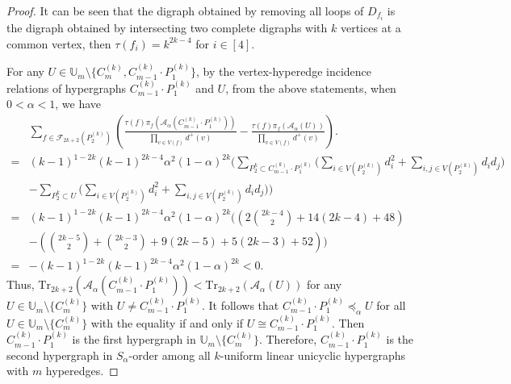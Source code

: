 \documentclass[10pt,a4paper]{amsart}
\begin{document}
\begin{proof}
It can be seen that the digraph obtained by removing all loops of $D_{f_i}$ is the digraph obtained by intersecting two complete digraphs with $k$ vertices at a common vertex, then $\tau(f_i)=k^{2k-4}$ for $i\in[4]$.

For any $U\in\mathbb{U}_{m}\setminus\{C_{m}^{(k)},C_{m-1}^{(k)}\cdot P_{1}^{(k)}\}$, by the vertex-hyperedge incidence relations of hypergraphs $C_{m-1}^{(k)}\cdot P_{1}^{(k)}$ and $U$, from the above statements,
when $0<\alpha<1$, we have
\begin{align*}
&\sum\limits_{f\in\mathcal{F}_{2k+2}(P_2^{(k)})}\left( \frac{\tau(f)\pi_{f}(\mathcal{A}_{\alpha}(C_{m-1}^{(k)}\cdot P_{1}^{(k)}))}{\prod\limits_{v\in V(f)}d^{+}(v)} - \frac{\tau(f)\pi_{f}(\mathcal{A}_{\alpha}(U))}{\prod\limits_{v\in V(f)}d^{+}(v)} \right).\\
=&(k-1)^{1-2k}(k-1)^{2k-4} \alpha^{2}(1-\alpha)^{2k} \Bigg( \sum\limits_{P_{2}^{k}\subset C_{m-1}^{(k)}\cdot P_{1}^{(k)}}\bigg( \sum\limits_{i\in V(P_{2}^{(k)})}d_i^2+\sum\limits_{i,j\in V(P_{2}^{(k)})}d_i d_j \bigg)\\
&-\sum\limits_{P_{2}^{k}\subset U}\bigg( \sum\limits_{i\in V(P_{2}^{(k)})}d_i^2+\sum\limits_{i,j\in V(P_{2}^{(k)})}d_i d_j \bigg) \Bigg)\\
=&(k-1)^{1-2k}(k-1)^{2k-4} \alpha^{2}(1-\alpha)^{2k} \Bigg( \left( 2\binom{2k-4}{2}+14(2k-4)+48 \right)\\
&-\left( \binom{2k-5}{2}+\binom{2k-3}{2}+9(2k-5)+5(2k-3)+52 \right) \Bigg)\\
=&-(k-1)^{1-2k}(k-1)^{2k-4}\alpha^{2}(1-\alpha)^{2k}<0.
\end{align*}
Thus, $\mathrm{Tr}_{2k+2}(\mathcal{A}_{\alpha}(C_{m-1}^{(k)}\cdot P_{1}^{(k)}))<\mathrm{Tr}_{2k+2}(\mathcal{A}_{\alpha}(U))$ for any $U\in\mathbb{U}_{m}\setminus\{C_{m}^{(k)}\}$ with $U\neq C_{m-1}^{(k)}\cdot P_{1}^{(k)}$.
It follows that $C_{m-1}^{(k)}\cdot P_{1}^{(k)}\preceq_{\alpha}U$ for all $U\in\mathbb{U}_{m}\setminus\{C_{m}^{(k)}\}$ with the equality if and only if $U\cong C_{m-1}^{(k)}\cdot P_{1}^{(k)}$.
Then $C_{m-1}^{(k)}\cdot P_{1}^{(k)}$ is the first hypergraph in $\mathbb{U}_{m}\setminus\{C_{m}^{(k)}\}$.
Therefore, $C_{m-1}^{(k)}\cdot P_{1}^{(k)}$ is the second hypergraph in $S_{\alpha}$-order among all $k$-uniform linear unicyclic hypergraphs with $m$ hyperedges.
\end{proof}
\end{document}
